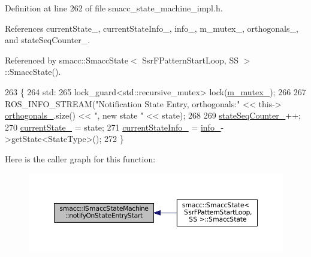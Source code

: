 Definition at line 262 of file smacc\+\_\+state\+\_\+machine\+\_\+impl.\+h.



References current\+State\+\_\+, current\+State\+Info\+\_\+, info\+\_\+, m\+\_\+mutex\+\_\+, orthogonals\+\_\+, and state\+Seq\+Counter\+\_\+.



Referenced by smacc\+::\+Smacc\+State$<$ Ssr\+F\+Pattern\+Start\+Loop, S\+S $>$\+::\+Smacc\+State().


\begin{DoxyCode}
263 \{
264 std:
265     lock\_guard<std::recursive\_mutex> lock(\hyperlink{classsmacc_1_1ISmaccStateMachine_aac785541646e5c517273bf31072505a1}{m\_mutex\_});
266 
267     ROS\_INFO\_STREAM(\textcolor{stringliteral}{"Notification State Entry, orthogonals:"} << this->
      \hyperlink{classsmacc_1_1ISmaccStateMachine_ae8e5c25d0aecd91fe496df13751bc667}{orthogonals\_}.size() << \textcolor{stringliteral}{", new state "} << state);
268 
269     \hyperlink{classsmacc_1_1ISmaccStateMachine_ab41ee07d20715142e2f7c92d551b2bd6}{stateSeqCounter\_}++;
270     \hyperlink{classsmacc_1_1ISmaccStateMachine_a9c6e7745205bcce80a301f2fbe8f7e99}{currentState\_} = state;
271     \hyperlink{classsmacc_1_1ISmaccStateMachine_ac8ac420db18ed72cc0c7535f16c0aae8}{currentStateInfo\_} = \hyperlink{classsmacc_1_1ISmaccStateMachine_a5ec3201cbddab4f062f572fb33021041}{info\_}->getState<StateType>();
272 \}
\end{DoxyCode}


Here is the caller graph for this function\+:
\nopagebreak
\begin{figure}[H]
\begin{center}
\leavevmode
\includegraphics[width=350pt]{classsmacc_1_1ISmaccStateMachine_aeec54e997d715b105ebfeb5caadc4fbf_icgraph}
\end{center}
\end{figure}


